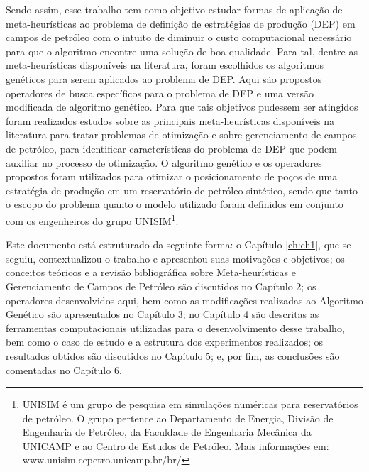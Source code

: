 Sendo assim, esse trabalho tem como objetivo estudar formas de aplicação de meta-heurísticas ao problema de definição de estratégias de produção (DEP) em campos de petróleo com o intuito de diminuir o custo computacional necessário para que o algoritmo encontre uma solução de boa qualidade. Para tal, dentre as meta-heurísticas disponíveis na literatura, foram escolhidos os algoritmos genéticos para serem aplicados ao problema de DEP. Aqui são propostos operadores de busca específicos para o problema de DEP e uma versão modificada de algoritmo genético. Para que tais objetivos pudessem ser atingidos foram realizados estudos sobre as principais meta-heurísticas disponíveis na literatura para tratar problemas de otimização e sobre gerenciamento de campos de petróleo, para identificar características do problema de DEP que podem auxiliar no processo de otimização. O algoritmo genético e os operadores propostos foram utilizados para otimizar o posicionamento de poços de uma estratégia de produção em um reservatório de petróleo sintético, sendo que tanto o escopo do problema quanto o modelo utilizado foram definidos em conjunto com os engenheiros do grupo UNISIM\footnote{UNISIM é um grupo de pesquisa em simulações numéricas para reservatórios de petróleo. O grupo pertence ao Departamento de Energia, Divisão de Engenharia de Petróleo, da Faculdade de Engenharia Mecânica da UNICAMP e ao Centro de Estudos de Petróleo. Mais informações em: www.unisim.cepetro.unicamp.br/br/}.

Este documento está estruturado da seguinte forma: o Capítulo \ref{ch:ch1}, que se seguiu, contextualizou o trabalho e apresentou suas motivações e objetivos; os conceitos teóricos e a revisão bibliográfica sobre Meta-heurísticas e Gerenciamento de Campos de Petróleo são discutidos no Capítulo 2; os operadores desenvolvidos aqui, bem como as modificações realizadas ao Algoritmo Genético são apresentados no Capítulo 3; no Capítulo 4 são descritas as ferramentas computacionais utilizadas para o desenvolvimento desse trabalho, bem como o caso de estudo e a estrutura dos experimentos realizados; os resultados obtidos são discutidos no Capítulo 5; e, por fim, as conclusões são comentadas no Capítulo 6.
